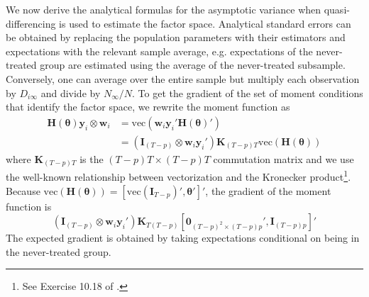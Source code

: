 We now derive the analytical formulas for the asymptotic variance when quasi-differencing is used to estimate the factor space. Analytical standard errors can be obtained by replacing the population parameters with their estimators and expectations with the relevant sample average, e.g. expectations of the never-treated group are estimated using the average of the never-treated subsample. Conversely, one can average over the entire sample but multiply each observation by $D_{i\infty}$ and divide by $N_{\infty} / N$. To get the gradient of the set of moment conditions that identify the factor space, we rewrite the moment function as 
\begin{align*}
    \bm H(\bm \theta) \bm y_i \otimes \bm w_i
    &= \text{vec}(\bm w_i \bm y_i' \bm H(\bm \theta)')\\
    &= (\bm I_{(T-p)} \otimes \bm w_i \bm y_i') \bm K_{(T-p)T} \text{vec}(\bm H(\bm \theta))
\end{align*}
where $\bm K_{(T-p)T}$ is the $(T-p)T \times (T-p)T$ commutation matrix and we use the well-known relationship between vectorization and the Kronecker product\footnote{See Exercise 10.18 of \citet{abadir2005matrix}.}. Because $\text{vec}(\bm H(\bm \theta)) = [\text{vec}(\bm I_{T-p})', \bm \theta']'$, the gradient of the moment function is 
\begin{equation}
    \left( \bm I_{(T-p)} \otimes \bm w_i \bm y_i' \right) \bm K_{T(T-p)} [\bm 0_{(T-p)^2 \times (T-p)p}', \bm I_{(T-p)p}]'
\end{equation}
The expected gradient is obtained by taking expectations conditional on being in the never-treated group.

